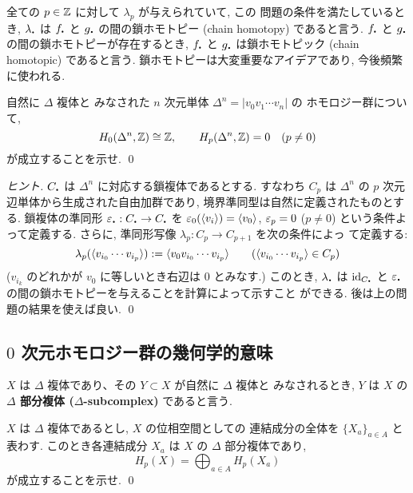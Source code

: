 \documentclass[12pt,twoside]{jarticle}
\begin{document}
\noindent 全ての $p\in{\mathbb Z}$ に対して $\lambda_p$ が与えられていて, この
問題の条件を満たしているとき, $\lambda_\bcdot$ は $f_\bcdot$ と %
$g_\bcdot$ の間の鎖ホモトピー (chain homotopy) であると言う. 
$f_\bcdot$ と $g_\bcdot$ の間の鎖ホモトピーが存在するとき, %
$f_\bcdot$ と $g_\bcdot$ は鎖ホモトピック (chain homotopic) であると言う. 
鎖ホモトピーは大変重要なアイデアであり, 今後頻繁に使われる.

\begin{question}[単体のホモロジー群]\qstar{*}\label{q:H_p(n-simplex)}
 自然に $\Delta$ 複体と
 みなされた $n$ 次元単体 $\Delta^n=|v_0v_1\cdots v_n|$ の
 ホモロジー群について,
  \[
    H_0(\Delta^n,{\mathbb Z}) \cong {\mathbb Z},
    \qquad
    H_p(\Delta^n,{\mathbb Z}) = 0 \quad (p\ne 0) 
  \]
  が成立することを示せ. \qed
\end{question}

\begin{proof}[ヒント]
$C_\bcdot$ は $\Delta^n$ に対応する鎖複体であるとする.
すなわち $C_p$ は $\Delta^n$ の $p$ 次元辺単体から生成された自由加群であり, 
境界準同型は自然に定義されたものとする. 
鎖複体の準同形 $\eps_\bcdot : C_\bcdot \to C_\bcdot$ を %
$\varepsilon_0(\langle v_i\rangle) = \langle v_0\rangle$, $\varepsilon_p = 0$ ($p\ne0$) 
という条件よって定義する. %
さらに, 準同形写像 $\lambda_p : C_p \to C_{p+1}$ を次の条件によっ
て定義する:
\[
  \lambda_p(\langle v_{i_0} \cdots v_{i_p} \rangle)
  := \langle v_0 v_{i_0} \cdots v_{i_p} \rangle
  \qquad
  (\langle v_{i_0} \cdots v_{i_p} \rangle \in C_p)
\]
($v_{i_k}$ のどれかが $v_0$ に等しいとき右辺は $0$ とみなす.)
このとき, $\lambda_\bcdot$ は $\id_{C_\bcdot}$ と %
$\eps_\bcdot$ の間の鎖ホモトピーを与えることを計算によって示すこと
ができる. 後は上の問題の結果を使えば良い.
\qed
\end{proof}


\subsection{$0$ 次元ホモロジー群の幾何学的意味}

$X$ は $\Delta$ 複体であり、その $Y\subset X$ が自然に $\Delta$ 複体と
みなされるとき, $Y$ は $X$ の {\bf $\Delta$ 部分複体 
($\Delta$-subcomplex)} であると言う.

\begin{question}[連結成分]
 $X$ は $\Delta$ 複体であるとし, $X$ の位相空間としての
 連結成分の全体を $\{X_a\}_{a\in A}$ と表わす. 
 このとき各連結成分 $X_a$ は $X$ の $\Delta$ 部分複体であり,
 \[
   H_p(X) = \bigoplus_{a\in A} H_p(X_a)
 \]
 が成立することを示せ.   \qed
\end{question}
\end{document}
